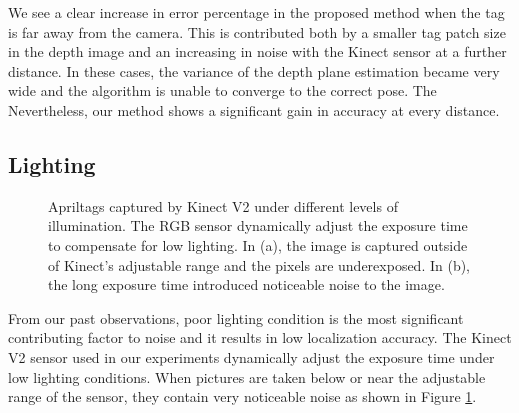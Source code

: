 We see a clear increase in error percentage in the proposed method when the tag is far away from the camera. This is contributed both by a smaller tag patch size in the depth image and an increasing in noise with the Kinect sensor at a further distance. In these cases, the variance of the depth plane estimation became very wide and the algorithm is unable to converge to the correct pose. The Nevertheless, our method shows a significant gain in accuracy at every distance.

\subsection{Lighting}
\begin{figure}
\centering
{}
\label{fig:illumination_tag}
\caption{Apriltags captured by Kinect V2 under different levels of illumination. The RGB sensor dynamically adjust the exposure time to compensate for low lighting. In (a), the image is captured outside of Kinect's adjustable range and the pixels are underexposed. In (b), the long exposure time introduced noticeable noise to the image. }
\end{figure}

From our past observations, poor lighting condition is the most significant contributing factor to noise and it results in low localization accuracy. The Kinect V2 sensor used in our experiments dynamically adjust the exposure time under low lighting conditions. When pictures are taken below or near the adjustable range of the sensor, they contain very noticeable noise as shown in Figure \ref{fig:illumination_tag}.

